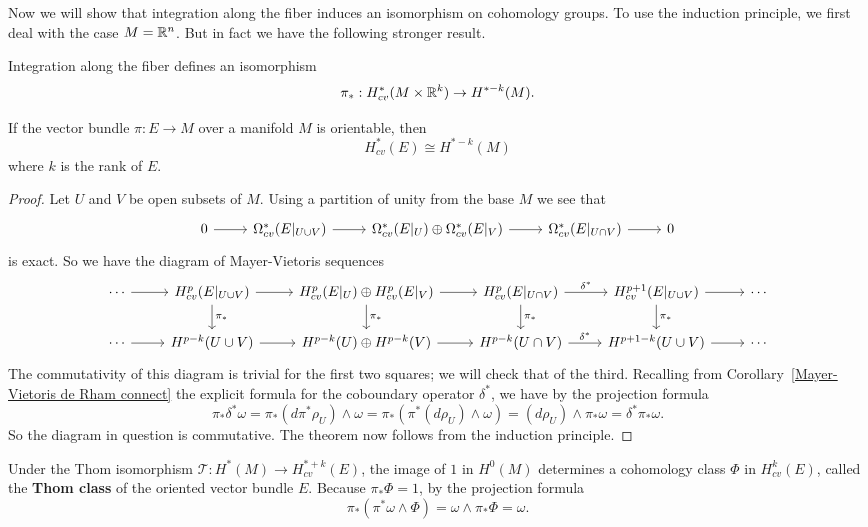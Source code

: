 Now we will show that integration along the fiber induces an isomorphism on cohomology groups. To use the induction principle, we first deal with the case $M=\mathbb{R}^n$. But 
in fact we have the following stronger result.
\begin{proposition}
Integration along the fiber defines an isomorphism
\[\pi_*:H^*_{cv}(M\times\mathbb{R}^k)\to H^{*-k}(M).\]
\end{proposition}
\begin{theorem}\label{Thom iso}
If the vector bundle $\pi:E\to M$ over a manifold $M$ is orientable, then
\[H^*_{cv}(E)\cong H^{*-k}(M)\]
where $k$ is the rank of $E$.
\end{theorem}
\begin{proof}
Let $U$ and $V$ be open subsets of $M$. Using a partition of unity from the base $M$ we see that
\[\begin{tikzcd}
0\ar[r]&\Omega^*_{cv}(E|_{U\cup V})\ar[r]&\Omega^*_{cv}(E|_{U})\oplus\Omega^*_{cv}(E|_{V})\ar[r]&\Omega^*_{cv}(E|_{U\cap V})\ar[r]&0
\end{tikzcd}\]
is exact. So we have the diagram of Mayer-Vietoris sequences
\[\begin{tikzcd}[scale=0.75]
\cdots\ar[r]&H^p_{cv}(E|_{U\cup V})\ar[r]\ar[d,"\pi_*"]&H^p_{cv}(E|_{U})\oplus H^p_{cv}(E|_{V})\ar[r]\ar[d,"\pi_*"]&H^p_{cv}(E|_{U\cap V})\ar[r,"\delta^*"]\ar[d,"\pi_*"]&H^{p+1}_{cv}(E|_{U\cup V})\ar[r]\ar[d,"\pi_*"]&\cdots\\
\cdots\ar[r]&H^{p-k}(U\cup V)\ar[r]&H^{p-k}(U)\oplus H^{p-k}(V)\ar[r]&H^{p-k}(U\cap V)\ar[r,"\delta^*"]&H^{p+1-k}(U\cup V)\ar[r]&\cdots
\end{tikzcd}\]
The commutativity of this diagram is trivial for the first two squares; we will check that of the third. Recalling from Corollary~\ref{Mayer-Vietoris de Rham connect} 
the explicit formula for the coboundary operator $\delta^*$, we have by the projection formula
\[\pi_*\delta^*\omega=\pi_*(d\pi^*\rho_U)\wedge\omega=\pi_*(\pi^*(d\rho_U)\wedge\omega)=(d\rho_U)\wedge\pi_*\omega=\delta^*\pi_*\omega.\]
So the diagram in question is commutative. The theorem now follows from the induction principle.
\end{proof}
Under the Thom isomorphism $\mathscr{T}:H^*(M)\to H^{*+k}_{cv}(E)$, the image of $1$ in $H^0(M)$ determines a cohomology class $\Phi$ in $H^k_{cv}(E)$, called the 
\textbf{Thom class} of the oriented vector bundle $E$. Because $\pi_*\Phi=1$, by the projection formula
\[\pi_*(\pi^*\omega\wedge\Phi)=\omega\wedge\pi_*\Phi=\omega.\]
